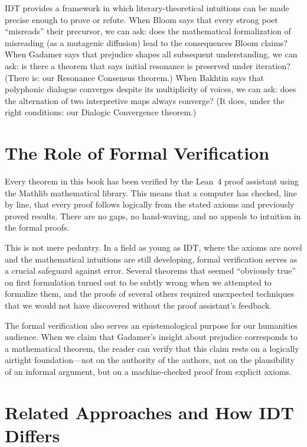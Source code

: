 \documentclass[11pt,openany]{book}
\theoremstyle{definition}
\theoremstyle{plain}
\theoremstyle{remark}
\begin{document}
IDT provides a framework in which literary-theoretical intuitions can be made precise enough to prove or refute. When Bloom says that every strong poet ``misreads'' their precursor, we can ask: does the mathematical formalization of misreading (as a mutagenic diffusion) lead to the consequences Bloom claims? When Gadamer says that prejudice shapes all subsequent understanding, we can ask: is there a theorem that says initial resonance is preserved under iteration? (There is: our Resonance Consensus theorem.) When Bakhtin says that polyphonic dialogue converges despite its multiplicity of voices, we can ask: does the alternation of two interpretive maps always converge? (It does, under the right conditions: our Dialogic Convergence theorem.)

\section{The Role of Formal Verification}

Every theorem in this book has been verified by the Lean~4 proof assistant using the Mathlib mathematical library. This means that a computer has checked, line by line, that every proof follows logically from the stated axioms and previously proved results. There are no gaps, no hand-waving, and no appeals to intuition in the formal proofs.

This is not mere pedantry. In a field as young as IDT, where the axioms are novel and the mathematical intuitions are still developing, formal verification serves as a crucial safeguard against error. Several theorems that seemed ``obviously true'' on first formulation turned out to be subtly wrong when we attempted to formalize them, and the proofs of several others required unexpected techniques that we would not have discovered without the proof assistant's feedback.

The formal verification also serves an epistemological purpose for our humanities audience. When we claim that Gadamer's insight about prejudice corresponds to a mathematical theorem, the reader can verify that this claim rests on a logically airtight foundation---not on the authority of the authors, not on the plausibility of an informal argument, but on a machine-checked proof from explicit axioms.

\section{Related Approaches and How IDT Differs}
\end{document}
